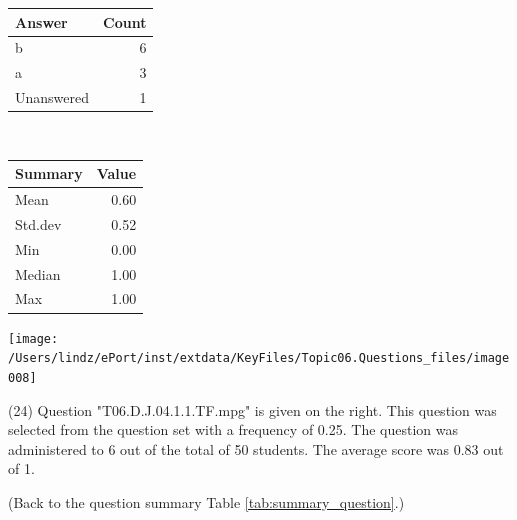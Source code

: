 \documentclass[12pt,english,nohyper]{tufte-handout}\usepackage[]{graphicx}\usepackage[]{color}
\begin{document}
\begin{center}%
\begin{tabular}{lr}
  \hline
Answer & Count \\ 
  \hline
b &   6 \\ 
  a &   3 \\ 
  Unanswered &   1 \\ 
   \hline
\end{tabular}
~~~~~~~~%
\begin{tabular}{lr}
  \hline
Summary & Value \\ 
  \hline
Mean & 0.60 \\ 
  Std.dev & 0.52 \\ 
  Min & 0.00 \\ 
  Median & 1.00 \\ 
  Max & 1.00 \\ 
   \hline
\end{tabular}
\end{center}\newpage{}



\vspace{5cm}\begin{marginfigure}\texttt{[image: /Users/lindz/ePort/inst/extdata/KeyFiles/Topic06.Questions\_files/image008]}\end{marginfigure}\vspace{-5cm} (24) Question "T06.D.J.04.1.1.TF.mpg" is given on the right. This question was selected from the question set with a frequency of 0.25. The question was administered to 6 out of the total of 50 students. The average score was 0.83 out of 1.

 (Back to the question summary Table \ref{tab:summary_question}.)
\end{document}
